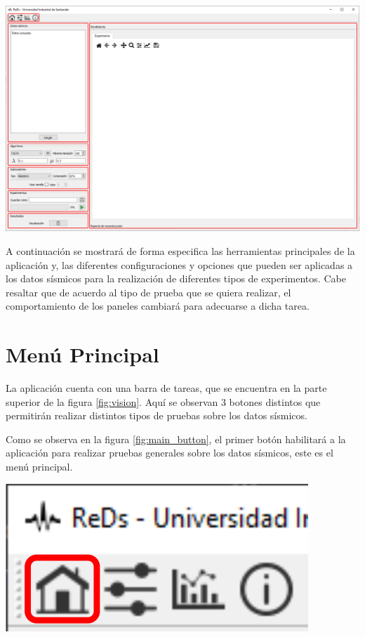 \documentclass[12pt,twoside,letter]{ol-softwaremanual}
\newcommand*\circled[1]{\tikz[baseline=(char.base)]{
            \node[shape=circle,draw,inner sep=2pt] (char) {#1};}}
\newenvironment{Figure}
  {\par\medskip\noindent\minipage{\linewidth}}
  {\endminipage\par\medskip}
\begin{document}
\begin{Figure}
    \centering
    \includegraphics[width=1\linewidth]{main.png}
    \label{fig:vision}
\end{Figure}

A continuación se mostrará de forma especifica las herramientas principales de la aplicación y, las diferentes configuraciones y opciones que pueden ser aplicadas a los datos sísmicos para la realización de diferentes tipos de experimentos. Cabe resaltar que de acuerdo al tipo de prueba que se quiera realizar, el comportamiento de los paneles cambiará para adecuarse a dicha tarea.

\section{Menú Principal}

La aplicación cuenta con una barra de tareas, que se encuentra en la parte superior \circled{1} de la figura \ref{fig:vision}. Aquí se observan 3 botones distintos que permitirán realizar distintos tipos de pruebas sobre los datos sísmicos.

\begin{multicols}{2}

Como se observa en la figura \ref{fig:main_button}, el primer botón habilitará a la aplicación para realizar pruebas generales sobre los datos sísmicos, este es el menú principal.

\begin{Figure}
    \centering
    \includegraphics[width=0.4\linewidth]{main-tab.png}
    \label{fig:main_button}
\end{Figure}

\end{multicols}
\end{document}
